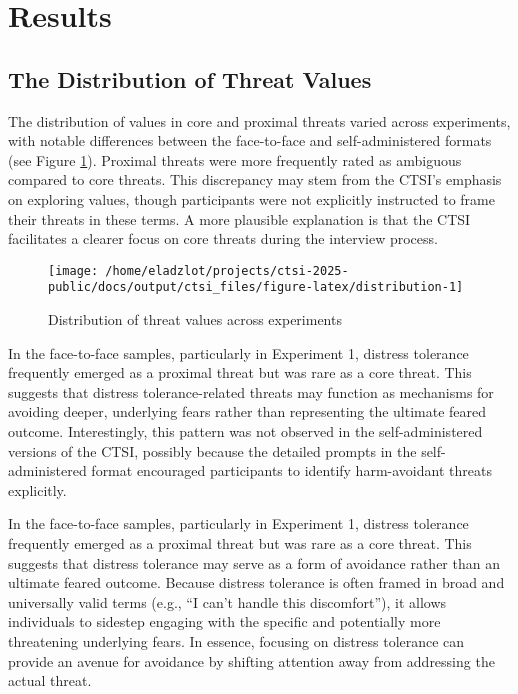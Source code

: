 \documentclass[
  man,floatsintext]{apa7}
\begin{document}
\section{Results}\label{results}

\subsection{The Distribution of Threat Values}\label{the-distribution-of-threat-values}

The distribution of values in core and proximal threats varied across experiments, with notable differences between the face-to-face and self-administered formats (see Figure \ref{fig:distribution}).
Proximal threats were more frequently rated as ambiguous compared to core threats.
This discrepancy may stem from the CTSI's emphasis on exploring values, though participants were not explicitly instructed to frame their threats in these terms.
A more plausible explanation is that the CTSI facilitates a clearer focus on core threats during the interview process.



\begin{figure}
\texttt{[image: /home/eladzlot/projects/ctsi-2025-public/docs/output/ctsi\_files/figure-latex/distribution-1]} \caption{Distribution of threat values across experiments}\label{fig:distribution}
\end{figure}

In the face-to-face samples, particularly in Experiment 1, distress tolerance frequently emerged as a proximal threat but was rare as a core threat.
This suggests that distress tolerance-related threats may function as mechanisms for avoiding deeper, underlying fears rather than representing the ultimate feared outcome.
Interestingly, this pattern was not observed in the self-administered versions of the CTSI, possibly because the detailed prompts in the self-administered format encouraged participants to identify harm-avoidant threats explicitly.

In the face-to-face samples, particularly in Experiment 1, distress tolerance frequently emerged as a proximal threat but was rare as a core threat.
This suggests that distress tolerance may serve as a form of avoidance rather than an ultimate feared outcome.
Because distress tolerance is often framed in broad and universally valid terms (e.g., ``I can't handle this discomfort''), it allows individuals to sidestep engaging with the specific and potentially more threatening underlying fears.
In essence, focusing on distress tolerance can provide an avenue for avoidance by shifting attention away from addressing the actual threat.
\end{document}
